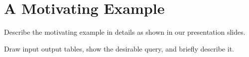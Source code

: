 \section{A Motivating Example}
\label{sec:example}

Describe the motivating example in details as shown in our presentation slides.

Draw input output tables, show the desirable query, and briefly describe it.
